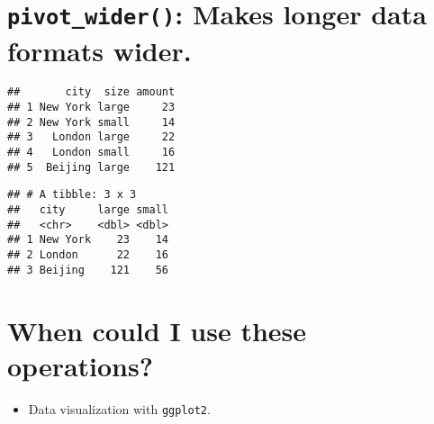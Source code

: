 \documentclass[]{article}
\newenvironment{Shaded}{\begin{snugshade}}{\end{snugshade}}
\newcommand{\DataTypeTok}[1]{\textcolor[rgb]{0.13,0.29,0.53}{#1}}
\newcommand{\DecValTok}[1]{\textcolor[rgb]{0.00,0.00,0.81}{#1}}
\newcommand{\KeywordTok}[1]{\textcolor[rgb]{0.13,0.29,0.53}{\textbf{#1}}}
\newcommand{\NormalTok}[1]{#1}
\newcommand{\OperatorTok}[1]{\textcolor[rgb]{0.81,0.36,0.00}{\textbf{#1}}}
\newcommand{\StringTok}[1]{\textcolor[rgb]{0.31,0.60,0.02}{#1}}
\providecommand{\tightlist}{%
  \setlength{\itemsep}{0pt}\setlength{\parskip}{0pt}}
\begin{document}
\hypertarget{pivot_wider-makes-longer-data-formats-wider.}{%
\section{\texorpdfstring{\texttt{pivot\_wider()}: Makes longer data
formats
wider.}{pivot\_wider(): Makes longer data formats wider.}}\label{pivot_wider-makes-longer-data-formats-wider.}}

\begin{Shaded}
\end{Shaded}

\begin{verbatim}
##       city  size amount
## 1 New York large     23
## 2 New York small     14
## 3   London large     22
## 4   London small     16
## 5  Beijing large    121
\end{verbatim}

\begin{Shaded}
\end{Shaded}

\begin{verbatim}
## # A tibble: 3 x 3
##   city     large small
##   <chr>    <dbl> <dbl>
## 1 New York    23    14
## 2 London      22    16
## 3 Beijing    121    56
\end{verbatim}

\hypertarget{when-could-i-use-these-operations}{%
\section{When could I use these
operations?}\label{when-could-i-use-these-operations}}

\begin{itemize}
\tightlist
\item
  Data visualization with \texttt{ggplot2}.
\end{itemize}
\end{document}
